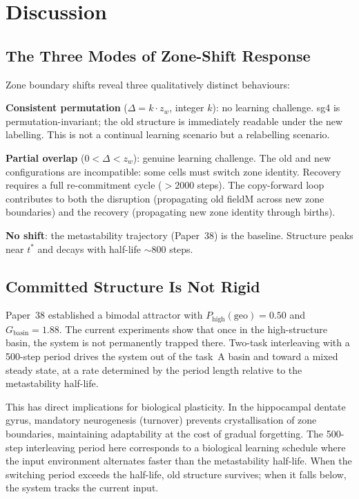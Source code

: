 \documentclass[11pt]{article}
\begin{document}
\section{Discussion}

\subsection{The Three Modes of Zone-Shift Response}

Zone boundary shifts reveal three qualitatively distinct behaviours:

\textbf{Consistent permutation} ($\Delta = k \cdot z_w$, integer $k$): no learning
challenge.
sg4 is permutation-invariant; the old structure is immediately readable under the new
labelling.
This is not a continual learning scenario but a relabelling scenario.

\textbf{Partial overlap} ($0 < \Delta < z_w$): genuine learning challenge.
The old and new configurations are incompatible: some cells must switch zone identity.
Recovery requires a full re-commitment cycle ($>2000$ steps).
The copy-forward loop contributes to both the disruption (propagating old fieldM across
new zone boundaries) and the recovery (propagating new zone identity through births).

\textbf{No shift}: the metastability trajectory (Paper~38) is the baseline.
Structure peaks near $t^*$ and decays with half-life $\sim800$ steps.

\subsection{Committed Structure Is Not Rigid}

Paper~38 established a bimodal attractor with $P_\mathrm{high}(\mathrm{geo}) = 0.50$ and
$G_\mathrm{basin} = 1.88$.
The current experiments show that once in the high-structure basin, the system is not
permanently trapped there.
Two-task interleaving with a 500-step period drives the system out of the task~A basin
and toward a mixed steady state, at a rate determined by the period length relative to the
metastability half-life.

This has direct implications for biological plasticity.
In the hippocampal dentate gyrus, mandatory neurogenesis (turnover) prevents crystallisation
of zone boundaries, maintaining adaptability at the cost of gradual forgetting.
The 500-step interleaving period here corresponds to a biological learning schedule
where the input environment alternates faster than the metastability half-life.
When the switching period exceeds the half-life, old structure survives; when it falls
below, the system tracks the current input.
\end{document}

